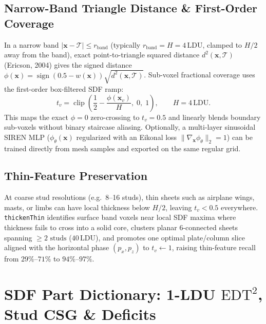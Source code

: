 \documentclass[11pt,twoside]{article}
\newcommand{\ldu}{\,\text{LDU}}
\newcommand{\code}[1]{\texttt{#1}}
\begin{document}
\subsection{Narrow-Band Triangle Distance \& First-Order Coverage}
In a narrow band $|\mathbf{x} - \mathcal{T}| \le r_{\text{band}}$ (typically $r_{\text{band}} = H = 4\ldu$, clamped to $H/2$ away from the band), exact point-to-triangle squared distance $d^2(\mathbf{x}, \mathcal{T})$ (Ericson, 2004) gives the signed distance $\phi(\mathbf{x}) = \operatorname{sign}(0.5 - w(\mathbf{x})) \sqrt{d^2(\mathbf{x},\mathcal{T})}$. Sub-voxel fractional coverage uses the first-order box-filtered SDF ramp:
\begin{equation}
  t_v = \operatorname{clip}\!\left(\frac{1}{2} - \frac{\phi(\mathbf{x}_v)}{H},\; 0,\; 1\right), \qquad H = 4\ldu.
  \label{eq:boxfilter}
\end{equation}
This maps the exact $\phi=0$ zero-crossing to $t_v = 0.5$ and linearly blends boundary sub-voxels without binary staircase aliasing. Optionally, a multi-layer sinusoidal SIREN MLP ($\phi_\theta(\mathbf{x})$ regularized with an Eikonal loss $\|\nabla_{\mathbf{x}} \phi_\theta\|_2 = 1$) can be trained directly from mesh samples and exported on the same regular grid.

\subsection{Thin-Feature Preservation}
At coarse stud resolutions (e.g.\ 8--16 studs), thin sheets such as airplane wings, masts, or limbs can have local thickness below $H/2$, leaving $t_v < 0.5$ everywhere. \code{thickenThin} identifies surface band voxels near local SDF maxima where thickness fails to cross into a solid core, clusters planar 6-connected sheets spanning $\ge 2\text{ studs}$ ($40\ldu$), and promotes one optimal plate/column slice aligned with the horizontal phase $(p_x,p_z)$ to $t_v \leftarrow 1$, raising thin-feature recall from $29\%$--$71\%$ to $94\%$--$97\%$.

\section{SDF Part Dictionary: 1-LDU \texorpdfstring{$\mathrm{EDT}^2$}{EDT2}, Stud CSG \& Deficits}
\end{document}
